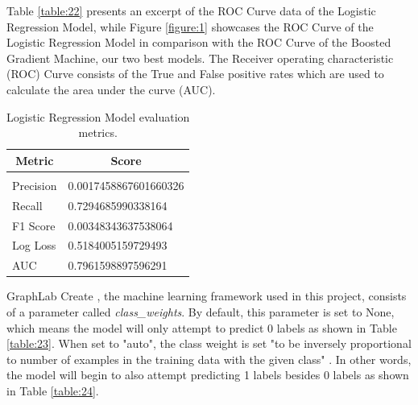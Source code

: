 \documentclass{article} %
\begin{document}
Table \ref{table:22} presents an excerpt of the ROC Curve data of the Logistic Regression Model, while Figure \ref{figure:1} showcases the ROC Curve of the Logistic Regression Model in comparison with the ROC Curve of the Boosted Gradient Machine, our two best models. The Receiver operating characteristic (ROC) Curve consists of the True and False positive rates which are used to calculate the area under the curve (AUC).

\begin{table}[!htbp]
\caption{Logistic Regression Model evaluation metrics.}
\label{table:21}
\begin{center}
\begin{tabular}{l l}
\multicolumn{1}{c}{\bf Metric} & \multicolumn{1}{c}{\bf Score}
\\ \hline \\
Precision & 0.0017458867601660326\\
Recall    & 0.7294685990338164\\
F1 Score  & 0.00348343637538064\\
Log Loss  & 0.5184005159729493\\
AUC       & 0.7961598897596291\\
\end{tabular}
\end{center}
\end{table}

GraphLab Create \cite{graphlabcreate}, the machine learning framework used in this project, consists of a parameter called \textit{class\_weights}. By default, this parameter is set to None, which means the model will only attempt to predict 0 labels as shown in Table \ref{table:23}. When set to "auto", the class weight is set "to be inversely proportional to number of examples in the training data with the given class" \cite{graphlabcreate_logistic_classifier}. In other words, the model will begin to also attempt predicting 1 labels besides 0 labels as shown in Table \ref{table:24}.
\end{document}
